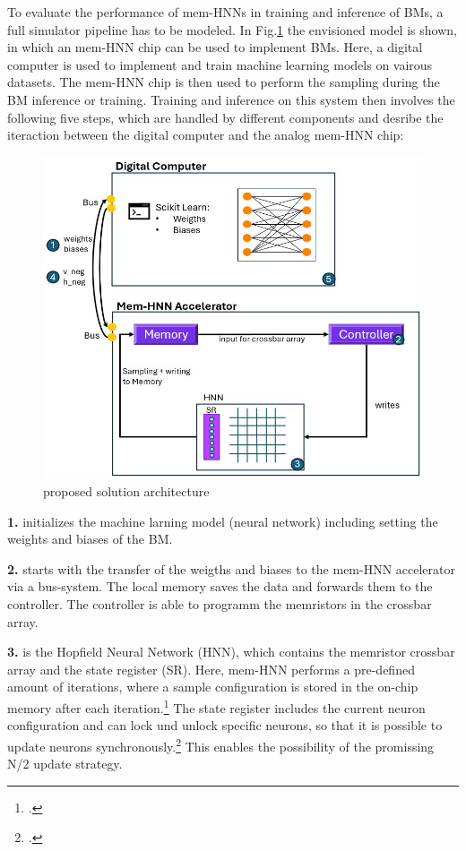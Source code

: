 To evaluate the performance of \ac{mem-HNN}s in training and inference of \ac{BM}s, a full simulator pipeline has to be modeled.
In Fig.\ref{Overall architecture} the envisioned model is shown, in which an \ac{mem-HNN} chip can be used to implement \ac{BM}s.
Here, a digital computer is used to implement and train machine learning models on vairous datasets.
The \ac{mem-HNN} chip is then used to perform the sampling during the \ac{BM} inference or training.
Training and inference on this system then involves the following five steps, which are handled by different components and desribe the iteraction between the digital computer and the analog \ac{mem-HNN} chip:
\begin{figure}[H]
    \centering
    \includegraphics[width=0.80\linewidth]{graphics/Analysemodell.JPG}
    \caption{proposed solution architecture}
    \label{Overall architecture}
\end{figure}
\textbf{1.} initializes the machine larning model (neural network) including setting the weights and biases of the \ac{BM}. 

\textbf{2.} starts with the transfer of the weigths and biases to the \ac{mem-HNN} accelerator via a bus-system. 
The local memory saves the data and forwards them to the controller. 
The controller is able to programm the memristors in the crossbar array. 

\textbf{3.} is the Hopfield Neural Network (HNN), which contains the memristor crossbar array and the state register (SR).
Here, \ac{mem-HNN} performs a pre-defined amount of iterations, where a sample configuration is stored in the on-chip memory after each iteration.\footcite[cf.][18]{caiHarnessingIntrinsicNoise2019}
The state register includes the current neuron configuration and can lock und unlock specific neurons, so that it is possible to update neurons synchronously.\footcite[cf.][18]{caiHarnessingIntrinsicNoise2019}
This enables the possibility of the promissing N/2 update strategy.

